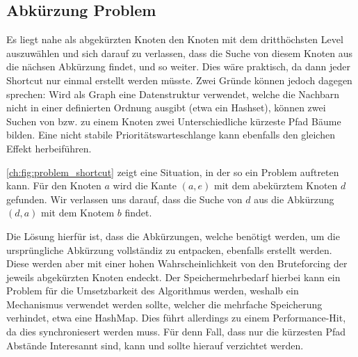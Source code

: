 \subsection{Abkürzung Problem}

Es liegt nahe als abgekürzten Knoten den Knoten mit dem dritthöchsten Level auszuwählen und sich darauf zu verlassen, dass die Suche von diesem Knoten aus die nächsen Abkürzung findet, und so weiter.
Dies wäre praktisch, da dann jeder Shortcut nur einmal erstellt werden müsste.
Zwei Gründe können jedoch dagegen sprechen:
Wird als Graph eine Datenstruktur verwendet, welche die Nachbarn nicht in einer definierten Ordnung ausgibt (etwa ein Hashset), können zwei Suchen von bzw. zu einem Knoten zwei Unterschiedliche kürzeste Pfad Bäume bilden.
Eine nicht stabile Prioritätswarteschlange kann ebenfalls den gleichen Effekt herbeiführen.

\autoref{ch:fig:problem_shortcut} zeigt eine Situation, in der so ein Problem auftreten kann.
Für den Knoten $a$ wird die Kante $(a, e)$ mit dem abekürztem Knoten $d$ gefunden.
Wir verlassen uns darauf, dass die Suche von $d$ aus die Abkürzung $(d, a)$ mit dem Knotem $b$ findet.

Die Lösung hierfür ist, dass die Abkürzungen, welche benötigt werden, um die ursprüngliche Abkürzung vollständiz zu entpacken, ebenfalls erstellt werden.
Diese werden aber mit einer hohen Wahrscheinlichkeit von den Bruteforcing der jeweils abgekürzten Knoten endeckt.
Der Speichermehrbedarf hierbei kann ein Problem für die Umsetzbarkeit des Algorithmus werden, weshalb ein Mechanismus verwendet werden sollte, welcher die mehrfache Speicherung verhindet, etwa eine HashMap.
Dies führt allerdings zu einem Performance-Hit, da dies synchroniesert werden muss.
Für denn Fall, dass nur die kürzesten Pfad Abstände Interesannt sind, kann und sollte hierauf verzichtet werden.

